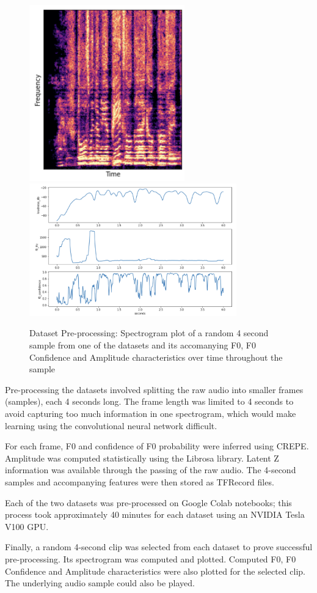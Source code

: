 \begin{figure}[H]
    \centering
    \includegraphics[width=0.6\textwidth]{research/dataset_preparation/PreprocessingSpecplot.png}
    \includegraphics[width=0.8\textwidth]{research/dataset_preparation/PreprocessingFeatures.png}
    \caption{Dataset Pre-processing: Spectrogram plot of a random 4 second sample from one of the datasets and its accomanying F0, F0 Confidence and Amplitude characteristics over time throughout the sample}
\end{figure}

Pre-processing the datasets involved splitting the raw audio into smaller frames (samples), each 4 seconds long. The frame length was limited to 4 seconds to avoid capturing too much information in one spectrogram, which would make learning using the convolutional neural network difficult.

For each frame, F0 and confidence of F0 probability were inferred using CREPE\cite{CREPE}. Amplitude was computed statistically using the Librosa library\cite{LibrosaPip}. Latent Z information was available through the passing of the raw audio. The 4-second samples and accompanying features were then stored as TFRecord files.

Each of the two datasets was pre-processed on Google Colab notebooks; this process took approximately 40 minutes for each dataset using an NVIDIA Tesla V100 GPU.

Finally, a random 4-second clip was selected from each dataset to prove successful pre-processing. Its spectrogram was computed and plotted. Computed F0, F0 Confidence and Amplitude characteristics were also plotted for the selected clip. The underlying audio sample could also be played.